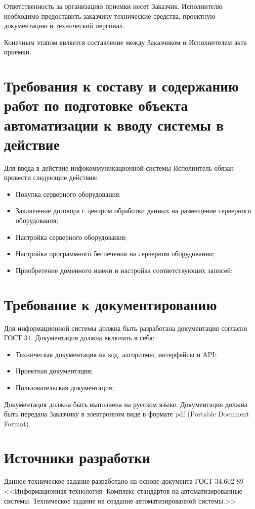 \documentclass[14pt]{extreport}
\begin{document}
    Ответственность за организацию приемки несет Заказчик. Исполнителю необходимо предоставить заказчику технические средства, проектную документацию и технический персонал.

    Конечным этапом является составление между Заказчиком и Исполнителем акта приемки. 

\section{Требования к составу и содержанию работ по подготовке объекта автоматизации к вводу системы в действие}
    Для ввода в действие инфокоммуникационной системы Исполнитель обязан провести следующие действия:
    \begin{itemize}
        \item Покупка серверного оборудования;
        \item Заключение договора с центром обработки данных на размещение серверного оборудования;
        \item Настройка серверного оборудования;
        \item Настройка программного беспечения на серверном оборудовании;
        \item Приобретение доменного имени и настройка соответствующих записей;
    \end{itemize}

\section{Требование к документированию}
    Для информационной системы должна быть разработана документация согласно ГОСТ 34. Документация должна включать в себя: 
    \begin{itemize}
        \item Техническая документация на код, алгоритмы, интерфейсы и API;
        \item Проектная документация;
        \item Пользовательская документация;
    \end{itemize}
    Документация должна быть выполнена на русском языке. Документация должна быть передана Заказчику в электронном виде в формате pdf (Portable Document Format).

\section{Источники разработки}
    Данное техническое задание разработано на основе документа ГОСТ 34.602-89 <<Информационная технология. Комплекс стандартов на автоматизированные системы. Техническое задание на создание автоматизированной системы.>>
\end{document}
